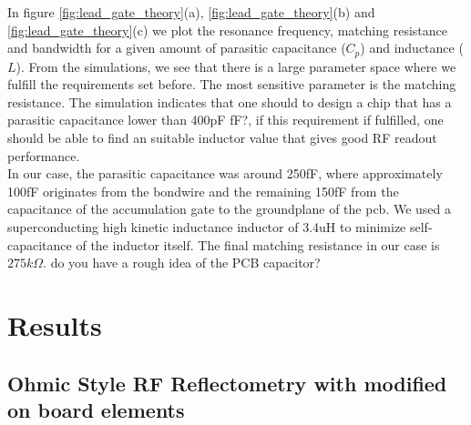 \documentclass[twocolumn]{article}
\begin{document}
	 In figure \ref{fig:lead_gate_theory}(a),  \ref{fig:lead_gate_theory}(b) and \ref{fig:lead_gate_theory}(c) we plot the resonance frequency, matching resistance and bandwidth for a given amount of parasitic capacitance ($C_p$) and inductance ($L$).
	 From the simulations, we see that there is a large parameter space where we fulfill the requirements set before. The most sensitive parameter is the matching resistance. The simulation indicates that one should to design a chip that has a parasitic capacitance lower than 400pF \color{red}fF?\color{black}, if this requirement if fulfilled, one should be able to find an suitable inductor value that gives good RF readout performance.\\
	 In our case, the parasitic capacitance was around 250fF, where approximately 100fF originates from the bondwire and the remaining 150fF from the capacitance of the accumulation gate to the groundplane of the pcb. We used a superconducting high kinetic inductance inductor of 3.4uH to minimize self-capacitance of the inductor itself. The final matching resistance in our case is $275k\Omega$.  \color{red}do you have a rough idea of the PCB capacitor?\color{black}

\section{Results} %
\label{sec:results}
\subsection{Ohmic Style RF Reflectometry with modified on board elements} %
	\label{sub:ohmic_style_rf_reflectometry_with_modified_on_board_elements}
\end{document}
